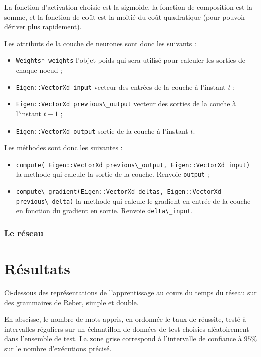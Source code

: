 \medskip

La fonction d'activation choisie est la sigmoide, la fonction de composition
est la somme, et la fonction de coût est la moitié du coût quadratique (pour
pouvoir dériver plus rapidement).

\medskip

Les attributs de la couche de neurones sont donc les suivants :

\begin{itemize}
  \item \verb+Weights* weights+ l'objet poids qui sera utilisé pour calculer
    les sorties de chaque noeud ;
  \item \verb+Eigen::VectorXd input+ vecteur des entrées de la couche à
    l'instant $t$ ;
  \item \verb+Eigen::VectorXd previous\_output+ vecteur des sorties de la
    couche à l'instant $t-1$ ;
  \item \verb+Eigen::VectorXd output+ sortie de la couche à l'instant $t$.
\end{itemize}

Les méthodes sont donc les suivantes :

\begin{itemize}
  \item \verb+compute( Eigen::VectorXd previous\_output, Eigen::VectorXd input)+
    la methode qui calcule la sortie de la couche. Renvoie \verb+output+ ;
  \item \verb+compute\_gradient(Eigen::VectorXd deltas, Eigen::VectorXd previous\_delta)+
    la methode qui calcule le gradient en entrée de la couche en fonction du
    gradient en sortie. Renvoie \verb+delta\_input+.
\end{itemize}


\subsubsection{Le réseau}


\section{Résultats}
Ci-dessous des représentations de l'apprentissage au cours du temps du réseau sur des
grammaires de Reber, simple et double.

\smallskip

En abscisse, le nombre de mots appris, en ordonnée le taux de réussite, testé à
intervalles réguliers sur un échantillon de données de test choisies aléatoirement
dans l'ensemble de test. La zone grise correspond à l'intervalle de confiance à
$95\%$ sur le nombre d'exécutions précisé.

